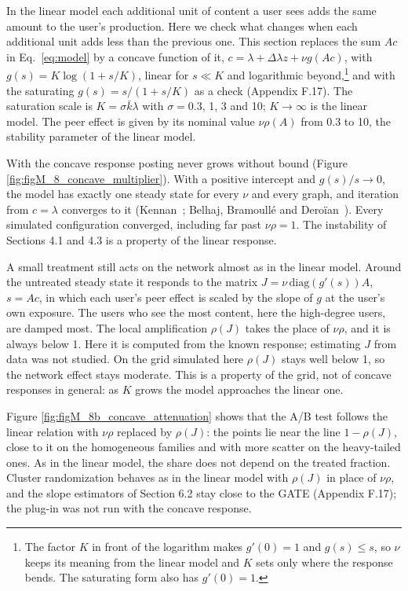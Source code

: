 \documentclass[final,5p,times,twocolumn,number]{elsarticle}
\begin{document}
In the linear model each additional unit of content a user sees adds the same amount to the user's production. Here we check what changes when each additional unit adds less than the previous one. This section replaces the sum $Ac$  in Eq.~\ref{eq:model} by a concave function of it, $c = \lambda + \Delta\lambda z + \nu g(Ac)$, with $g(s) = K\log(1 + s/K)$, linear for $s \ll K$  and logarithmic beyond,\footnote{The factor $K$  in front of the logarithm makes $g'(0) = 1$  and $g(s) \leq s$, so $\nu$  keeps its meaning from the linear model and $K$  sets only where the response bends. The saturating form also has $g'(0) = 1$.} and with the saturating $g(s) = s/(1 + s/K)$  as a check (Appendix F.17). The saturation scale is $K = \sigma\bar k\lambda$  with $\sigma = 0.3$, 1, 3 and 10; $K \to \infty$  is the linear model. The peer effect is given by its nominal value $\nu\rho(A)$  from 0.3 to 10, the stability parameter of the linear model.


With the concave response posting never grows without bound (Figure \ref{fig:figM_8_concave_multiplier}). With a positive intercept and $g(s)/s \to 0$, the model has exactly one steady state for every $\nu$  and every graph, and iteration from $c = \lambda$  converges to it (Kennan~\cite{r17}; Belhaj, Bramoullé and Deroïan~\cite{r3}). Every simulated configuration converged, including far past $\nu\rho = 1$. The instability of Sections 4.1 and 4.3 is a property of the linear response.


A small treatment still acts on the network almost as in the linear model. Around the untreated steady state it responds to the matrix $J = \nu\,\mathrm{diag}(g'(s))A$, $s = Ac$, in which each user's peer effect is scaled by the slope of $g$  at the user's own exposure. The users who see the most content, here the high-degree users, are damped most. The local amplification $\rho(J)$  takes the place of $\nu\rho$, and it is always below 1. Here it is computed from the known response; estimating $J$  from data was not studied. On the grid simulated here $\rho(J)$  stays well below 1, so the network effect stays moderate. This is a property of the grid, not of concave responses in general: as $K$  grows the model approaches the linear one.


Figure \ref{fig:figM_8b_concave_attenuation} shows that the A/B test follows the linear relation with $\nu\rho$  replaced by $\rho(J)$: the points lie near the line $1 - \rho(J)$, close to it on the homogeneous families and with more scatter on the heavy-tailed ones. As in the linear model, the share does not depend on the treated fraction. Cluster randomization behaves as in the linear model with $\rho(J)$  in place of $\nu\rho$, and the slope estimators of Section 6.2 stay close to the GATE (Appendix F.17); the plug-in was not run with the concave response.
\end{document}
